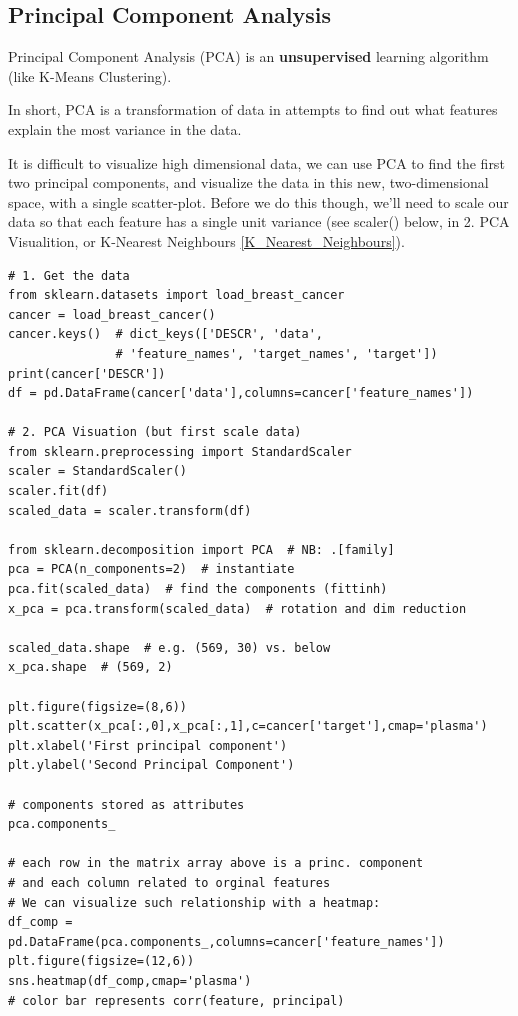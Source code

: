 \documentclass[11pt]{article}
\begin{document}
\subsection{Principal Component Analysis}
Principal Component Analysis (PCA) is an \textbf{unsupervised} learning algorithm (like K-Means Clustering).

In short, PCA is a transformation of data in attempts to find out what features explain the most variance in the data.

It is difficult to visualize high dimensional data, we can use PCA to find the first two principal components, and visualize the data in this new, two-dimensional space, with a single scatter-plot. Before we do this though, we'll need to scale our data so that each feature has a single unit variance (see scaler() below, in 2. PCA Visualition, or K-Nearest Neighbours \ref{K_Nearest_Neighbours}).

\begin{lstlisting}
# 1. Get the data
from sklearn.datasets import load_breast_cancer
cancer = load_breast_cancer()
cancer.keys()  # dict_keys(['DESCR', 'data', 
			   # 'feature_names', 'target_names', 'target'])
print(cancer['DESCR'])
df = pd.DataFrame(cancer['data'],columns=cancer['feature_names'])

# 2. PCA Visuation (but first scale data)
from sklearn.preprocessing import StandardScaler
scaler = StandardScaler() 
scaler.fit(df)
scaled_data = scaler.transform(df)

from sklearn.decomposition import PCA  # NB: .[family]
pca = PCA(n_components=2)  # instantiate
pca.fit(scaled_data)  # find the components (fittinh)
x_pca = pca.transform(scaled_data)  # rotation and dim reduction

scaled_data.shape  # e.g. (569, 30) vs. below
x_pca.shape  # (569, 2)  

plt.figure(figsize=(8,6))
plt.scatter(x_pca[:,0],x_pca[:,1],c=cancer['target'],cmap='plasma')
plt.xlabel('First principal component')
plt.ylabel('Second Principal Component')

# components stored as attributes
pca.components_

# each row in the matrix array above is a princ. component
# and each column related to orginal features
# We can visualize such relationship with a heatmap:
df_comp = pd.DataFrame(pca.components_,columns=cancer['feature_names'])
plt.figure(figsize=(12,6))
sns.heatmap(df_comp,cmap='plasma')
# color bar represents corr(feature, principal)
\end{lstlisting}
\end{document}
